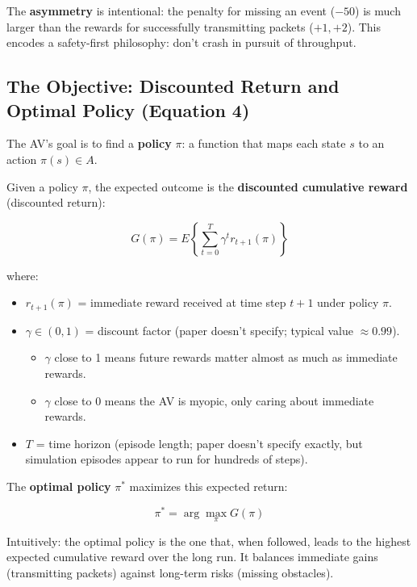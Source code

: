 \documentclass[12pt,a4paper]{article}
\begin{document}
The \textbf{asymmetry} is intentional: the penalty for missing an event ($-50$) is much larger than the rewards for successfully transmitting packets ($+1, +2$). This encodes a safety-first philosophy: don't crash in pursuit of throughput.

\subsection{The Objective: Discounted Return and Optimal Policy (Equation 4)}

The AV's goal is to find a \textbf{policy} $\pi$: a function that maps each state $s$ to an action $\pi(s) \in A$.

Given a policy $\pi$, the expected outcome is the \textbf{discounted cumulative reward} (discounted return):

\begin{equation}
G(\pi) = E\left\{ \sum_{t=0}^{T} \gamma^t r_{t+1}(\pi) \right\}
\end{equation}

\noindent where:
\begin{itemize}
    \item $r_{t+1}(\pi)$ = immediate reward received at time step $t+1$ under policy $\pi$.
    \item $\gamma \in (0,1)$ = discount factor (paper doesn't specify; typical value $\approx 0.99$).
    \begin{itemize}
        \item $\gamma$ close to 1 means future rewards matter almost as much as immediate rewards.
        \item $\gamma$ close to 0 means the AV is myopic, only caring about immediate rewards.
    \end{itemize}
    \item $T$ = time horizon (episode length; paper doesn't specify exactly, but simulation episodes appear to run for hundreds of steps).
\end{itemize}

The \textbf{optimal policy} $\pi^*$ maximizes this expected return:

\begin{equation}
\pi^* = \arg\max_\pi G(\pi)
\end{equation}

Intuitively: the optimal policy is the one that, when followed, leads to the highest expected cumulative reward over the long run. It balances immediate gains (transmitting packets) against long-term risks (missing obstacles).
\end{document}
